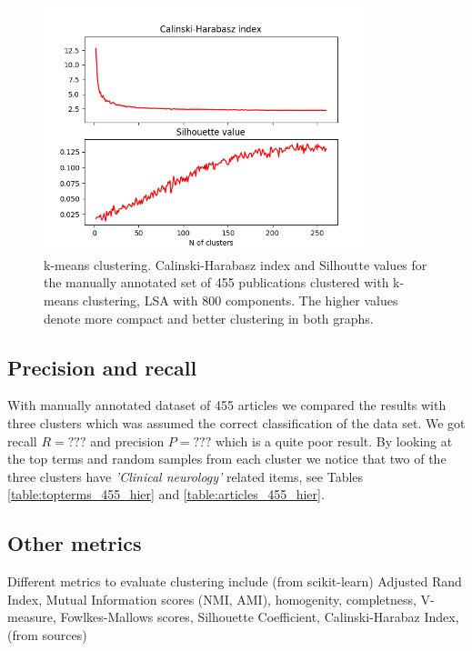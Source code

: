\begin{figure}[ht]
  \begin{center}    
\includegraphics[width=9.5cm]{images/c-h-silh-index-plot-519-2_260-800-kmeans.png}
    \caption{k-means clustering. Calinski-Harabasz index and Silhoutte values for the
    manually annotated set of 455 publications clustered with k-means 
    clustering, LSA with 800 components. The higher values denote 
    more compact and better clustering in both graphs.}
    \label{fig:ch-silh02}
  \end{center}
\end{figure}




\subsection{Precision and recall}
With manually annotated dataset of 455 articles we compared 
the results with three clusters which was assumed the correct 
classification of the data set. We got recall $R = ???$ and 
precision $P = ???$ which is
a quite poor result. By looking at the top terms and random samples
from each cluster we notice that two of the three clusters have 
\emph{'Clinical neurology'} related items, see Tables
\ref{table:topterms_455_hier} and \ref{table:articles_455_hier}.






\subsection{Other metrics}
Different metrics to evaluate clustering include (from 
scikit-learn) Adjusted Rand Index, Mutual Information scores 
(NMI, AMI), homogenity, completness, V-measure, Fowlkes-Mallows 
scores, Silhouette Coefficient, Calinski-Harabaz Index, (from 
sources) 


